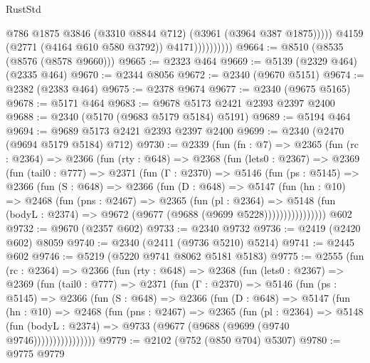\begin{lexlean}{RustStd}
\begin{coremodule}
                              @786
                              @1875
                              @3846
                              (@3310 @8844 @712)
                              (@3961 (@3964 @387 @1875)))))
                        @4159
                        (@2771 (@4164 @610 @580 @3792))
                        @4171))))))))))
@9664 := @8510 (@8535 (@8576 (@8578 @9660)))
@9665 := @2323 @464
@9669 := @5139 (@2329 @464) (@2335 @464)
@9670 := @2344 @8056
@9672 := @2340 (@9670 @5151)
@9674 := @2382 (@2383 @464)
@9675 := @2378 @9674
@9677 := @2340 (@9675 @5165)
@9678 := @5171 @464
@9683 := @9678 @5173 @2421 @2393 @2397 @2400
@9688 := @2340 (@5170 (@9683 @5179 @5184) @5191)
@9689 := @5194 @464
@9694 := @9689 @5173 @2421 @2393 @2397 @2400
@9699 := @2340 (@2470 (@9694 @5179 @5184) @712)
@9730 := @2339
    (fun (fn : @7) =>
    @2365
      (fun (rc : @2364) =>
      @2366
        (fun (rty : @648) =>
        @2368
          (fun (lets0 : @2367) =>
          @2369
            (fun (tail0 : @777) =>
            @2371
              (fun (Γ : @2370) =>
              @5146
                (fun (ps : @5145) =>
                @2366
                  (fun (S : @648) =>
                  @2366
                    (fun (D : @648) =>
                    @5147
                      (fun (hn : @10) =>
                      @2468
                        (fun (pns : @2467) =>
                        @2365
                          (fun (pl : @2364) =>
                          @5148
                            (fun (bodyL : @2374) => @9672 (@9677 (@9688 (@9699 @5228))))))))))))))))
    @602
@9732 := @9670 (@2357 @602)
@9733 := @2340 @9732
@9736 := @2419 (@2420 @602) @8059
@9740 := @2340 (@2411 (@9736 @5210) @5214)
@9741 := @2445 @602
@9746 := @5219 (@5220 @9741 @8062 @5181 @5183)
@9775 := @2555
    (fun (rc : @2364) =>
    @2366
      (fun (rty : @648) =>
      @2368
        (fun (lets0 : @2367) =>
        @2369
          (fun (tail0 : @777) =>
          @2371
            (fun (Γ : @2370) =>
            @5146
              (fun (ps : @5145) =>
              @2366
                (fun (S : @648) =>
                @2366
                  (fun (D : @648) =>
                  @5147
                    (fun (hn : @10) =>
                    @2468
                      (fun (pns : @2467) =>
                      @2365
                        (fun (pl : @2364) =>
                        @5148
                          (fun (bodyL : @2374) =>
                          @9733 (@9677 (@9688 (@9699 (@9740 @9746))))))))))))))))
@9779 := @2102 (@752 (@850 @704) @5307)
@9780 := @9775 @9779

\end{coremodule}
\end{lexlean}
